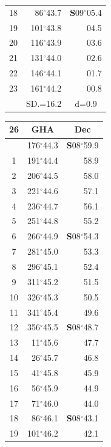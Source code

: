 \documentclass[10pt, a4paper]{report}
\begin{document}
\begin{scriptsize}
\begin{tabular*}{0.2\textwidth}[t]{@{\extracolsep{\fill}}|c|rr|}
18 & 86$^\circ$43.7 & \textbf{S}09$^\circ$05.4\\
19 & 101$^\circ$43.8 & 04.5\\
20 & 116$^\circ$43.9 & 03.6\\
21 & 131$^\circ$44.0 & \raisebox{0.24ex}{\boldmath$\cdot$~\boldmath$\cdot$~~}02.6\\
22 & 146$^\circ$44.1 & 01.7\\
23 & 161$^\circ$44.2 & 00.8\\
\hline
\rule{0pt}{2.4ex} & \multicolumn{1}{c}{SD.=16.2} & \multicolumn{1}{c|}{d=0.9}\\
\hline
\end{tabular*}\noindent
\begin{tabular*}{0.2\textwidth}[t]{@{\extracolsep{\fill}}|c|rr|}
\hline
\multicolumn{1}{|c|}{\rule{0pt}{2.6ex}\textbf{26}} & \multicolumn{1}{c}{\textbf{GHA}} & \multicolumn{1}{c|}{\textbf{Dec}}\\
\hline\rule{0pt}{2.6ex}\noindent
0 & 176$^\circ$44.3 & \textbf{S}08$^\circ$59.9\\
1 & 191$^\circ$44.4 & 58.9\\
2 & 206$^\circ$44.5 & 58.0\\
3 & 221$^\circ$44.6 & \raisebox{0.24ex}{\boldmath$\cdot$~\boldmath$\cdot$~~}57.1\\
4 & 236$^\circ$44.7 & 56.1\\
5 & 251$^\circ$44.8 & 55.2\\[2Pt]
6 & 266$^\circ$44.9 & \textbf{S}08$^\circ$54.3\\
7 & 281$^\circ$45.0 & 53.3\\
8 & 296$^\circ$45.1 & 52.4\\
9 & 311$^\circ$45.2 & \raisebox{0.24ex}{\boldmath$\cdot$~\boldmath$\cdot$~~}51.5\\
10 & 326$^\circ$45.3 & 50.5\\
11 & 341$^\circ$45.4 & 49.6\\[2Pt]
12 & 356$^\circ$45.5 & \textbf{S}08$^\circ$48.7\\
13 & 11$^\circ$45.6 & 47.7\\
14 & 26$^\circ$45.7 & 46.8\\
15 & 41$^\circ$45.8 & \raisebox{0.24ex}{\boldmath$\cdot$~\boldmath$\cdot$~~}45.9\\
16 & 56$^\circ$45.9 & 44.9\\
17 & 71$^\circ$46.0 & 44.0\\[2Pt]
18 & 86$^\circ$46.1 & \textbf{S}08$^\circ$43.1\\
19 & 101$^\circ$46.2 & 42.1\\

\end{tabular*}
\end{scriptsize}
\end{document}
